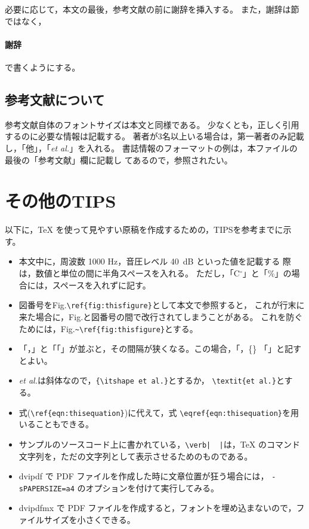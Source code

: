 \documentclass[10pt,twocolumn]{jarticle} %
\begin{document}
必要に応じて，本文の最後，参考文献の前に謝辞を挿入する。
また，謝辞は節ではなく，
\begin{verb}
\paragraph{謝辞}
\end{verb}
で書くようにする。

\subsection{参考文献について}

参考文献自体のフォントサイズは本文と同様である。
少なくとも，正しく引用するのに必要な情報は記載する。
著者が3名以上いる場合は，第一著者のみ記載し，「他」，「{\itshape et
al.}」を入れる。
書誌情報のフォーマットの例は，本ファイルの最後の「参考文献」欄に記載し
てあるので，参照されたい。

\section{その他のTIPS}

以下に，TeX を使って見やすい原稿を作成するための，TIPSを参考までに示す。
\begin{itemize}
\itemsep -5pt
\item 本文中に，周波数 1000 Hz，音圧レベル 40~dB といった値を記載する
際は，数値と単位の間に半角スペースを入れる。
ただし，{}「C$^\circ$」と「\%」の場合には，スペースを入れずに記す。
\item 図番号をFig.\verb|\ref{fig:thisfigure}|として本文で参照すると，
これが行末に来た場合に，Fig.と図番号の間で改行されてしまうことがある。
これを防ぐためには，Fig.\verb|~\ref{fig:thisfigure}|とする。
\item 「，」と「「」が並ぶと，その間隔が狭くなる。この場合，{}「，\{\}
「」と記すとよい。
\item \textit{et al.}は斜体なので，\verb|{\itshape et al.}|とするか，
\verb|\textit{et al.}|とする。
\item 式(\verb|\ref{eqn:thisequation}|)に代えて，式
\verb|\eqref{eqn:thisequation}|を用いることもできる。
\item サンプルのソースコード上に書かれている，\verb,\verb|  |,は，TeX
のコマンド文字列を，ただの文字列として表示させるためのものである。
\item dvipdf で PDF ファイルを作成した時に文章位置が狂う場合には，
{\tt -sPAPERSIZE=a4} のオプションを付けて実行してみる。
\item dvipdfmx で PDF ファイルを作成すると，フォントを埋め込まないので，ファイルサイズを小さくできる。
\end{itemize}
\end{document}
